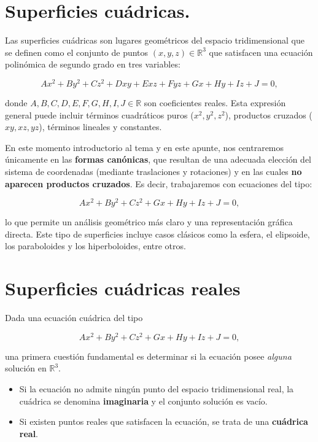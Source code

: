 \documentclass[11pt]{article}
\begin{document}
 \section*{Superficies cuádricas.}
Las superficies cuádricas son lugares geométricos del espacio tridimensional que se definen como el conjunto de puntos $(x, y, z) \in \mathbb{R}^3$ que satisfacen una ecuación polinómica de segundo grado en tres variables:

$$
Ax^2 + By^2 + Cz^2 + Dxy + Exz + Fyz + Gx + Hy + Iz + J = 0,
$$

donde $A, B, C, D, E, F, G, H, I, J \in \mathbb{R}$ son coeficientes reales. Esta expresión general puede incluir términos cuadráticos puros ($x^2, y^2, z^2$), productos cruzados ($xy, xz, yz$), términos lineales y constantes.

En este momento introductorio al tema y en este apunte, nos centraremos únicamente en las {\bf formas canónicas}, que resultan de una adecuada elección del sistema de coordenadas (mediante traslaciones y rotaciones) y en las cuales {\bf no aparecen productos cruzados}. Es decir, trabajaremos con ecuaciones del tipo:

$$
Ax^2 + By^2 + Cz^2 + Gx + Hy + Iz + J = 0,
$$

lo que permite un análisis geométrico más claro y una representación gráfica directa. Este tipo de superficies incluye casos clásicos como la esfera, el elipsoide, los paraboloides y los hiperboloides, entre otros.



\section*{Superficies cuádricas reales}

Dada una ecuación cuádrica del tipo

\[
Ax^2 + By^2 + Cz^2 + Gx + Hy + Iz + J = 0,
\]

una primera cuestión fundamental es determinar si la ecuación posee \emph{alguna} solución en $\mathbb{R}^3$. 

\begin{itemize}
    \item Si la ecuación no admite ningún punto del espacio tridimensional real, la cuádrica se denomina \textbf{imaginaria} y el conjunto solución es vacío.
    \item Si existen puntos reales que satisfacen la ecuación, se trata de una \textbf{cuádrica real}.
\end{itemize}
\end{document}
